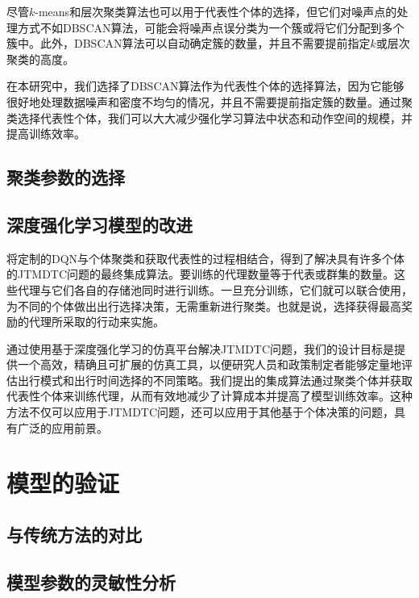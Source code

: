 尽管$k$-means和层次聚类算法也可以用于代表性个体的选择，但它们对噪声点的处理方式不如DBSCAN算法，可能会将噪声点误分类为一个簇或将它们分配到多个簇中。此外，DBSCAN算法可以自动确定簇的数量，并且不需要提前指定$k$或层次聚类的高度。

在本研究中，我们选择了DBSCAN算法作为代表性个体的选择算法，因为它能够很好地处理数据噪声和密度不均匀的情况，并且不需要提前指定簇的数量。通过聚类选择代表性个体，我们可以大大减少强化学习算法中状态和动作空间的规模，并提高训练效率。


\subsection{聚类参数的选择}

\subsection{深度强化学习模型的改进}
将定制的DQN与个体聚类和获取代表性的过程相结合，得到了解决具有许多个体的JTMDTC问题的最终集成算法。要训练的代理数量等于代表或群集的数量。这些代理与它们各自的存储池同时进行训练。一旦充分训练，它们就可以联合使用，为不同的个体做出出行选择决策，无需重新进行聚类。也就是说，选择获得最高奖励的代理所采取的行动来实施。

通过使用基于深度强化学习的仿真平台解决JTMDTC问题，我们的设计目标是提供一个高效，精确且可扩展的仿真工具，以便研究人员和政策制定者能够定量地评估出行模式和出行时间选择的不同策略。我们提出的集成算法通过聚类个体并获取代表性个体来训练代理，从而有效地减少了计算成本并提高了模型训练效率。这种方法不仅可以应用于JTMDTC问题，还可以应用于其他基于个体决策的问题，具有广泛的应用前景。

\section{模型的验证}

\subsection{与传统方法的对比}

\subsection{模型参数的灵敏性分析}